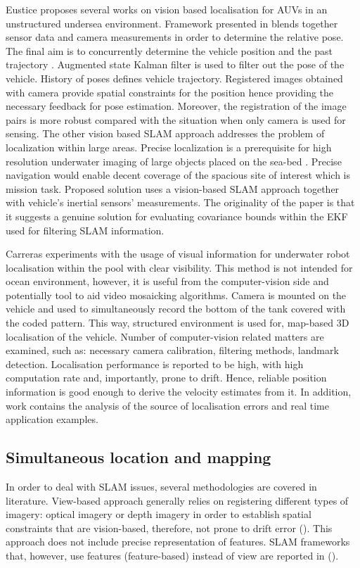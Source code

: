 Eustice proposes several works on vision based localisation for AUVs in an unstructured undersea environment. Framework presented in \cite{eustice04} blends together sensor data and camera measurements in order to determine the relative pose. The final aim is to concurrently determine the vehicle position and the past trajectory \cite{eustice04}. Augmented state Kalman filter is used to filter out the pose of the vehicle. History of poses defines vehicle trajectory. Registered images obtained with camera provide spatial constraints for the position hence providing the necessary feedback for pose estimation. Moreover, the registration of the image pairs is more robust compared with the situation when only camera is used for sensing. The other vision based SLAM approach \cite{eustice05} addresses the problem of localization within large areas. Precise localization is a prerequisite for high resolution underwater imaging of large objects placed on the sea-bed \cite{eustice05}. Precise navigation would enable decent coverage of the spacious site of interest which is mission task. Proposed solution uses a vision-based SLAM approach together with vehicle's inertial sensors' measurements. The originality of the paper is that it suggests a genuine solution for evaluating covariance bounds within the EKF used for filtering SLAM information. 

Carreras \cite{carreras03} experiments with the usage of visual information for underwater robot localisation within the pool with clear visibility. This method is not intended for ocean environment, however, it is useful from the computer-vision side and potentially tool to aid video mosaicking algorithms. Camera is mounted on the vehicle and used to simultaneously record the bottom of the tank covered with the coded pattern. This way, structured environment is used for, map-based 3D localisation of the vehicle. Number of computer-vision related matters are examined, such as: necessary camera calibration, filtering methods, landmark detection. Localisation performance is reported to be high, with high computation rate and, importantly, prone to drift. Hence, reliable position information is good enough to derive the velocity estimates from it. In addition, work contains the analysis of the source of localisation errors and real time application examples.  
\subsection{Simultaneous location and mapping}
In order to deal with SLAM issues, several methodologies are covered in literature. View-based approach generally relies on registering different types of imagery: optical imagery or depth imagery in order to establish spatial constraints that are vision-based, therefore, not prone to drift error (\cite{garcia01, eustice05towards, roman05}). This approach does not include precise representation of features. SLAM frameworks that, however, use features (feature-based) instead of view are reported in (\cite{williams04, ruiz01}).
